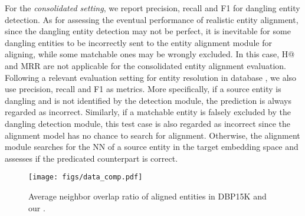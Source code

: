 For the \emph{consolidated setting},
we report precision, recall and F1 for dangling entity detection.
As for assessing the eventual performance of realistic entity alignment, since the dangling entity detection may not be perfect,
it is inevitable for some dangling entities to be incorrectly sent to the entity alignment module for aligning, while some matchable ones may be wrongly excluded.
In this case, H@ and MRR are not applicable for the consolidated entity alignment evaluation. 
Following a relevant evaluation setting for entity resolution in database \cite{DL4ER,EmbedER}, we also use precision, recall and F1 as metrics.
More specifically, if a source entity is dangling and is not identified by the detection module, the prediction is always regarded as incorrect. 
Similarly, if a matchable entity is falsely excluded by the dangling detection module, this test case is also regarded as incorrect since the alignment model has no chance to search for alignment. 
Otherwise, the alignment module searches for the NN of a source entity in the target embedding space and assesses if the predicated counterpart is correct. 

\begin{figure}[t]
	\centering
	\texttt{[image: figs/data\_comp.pdf]}
	\caption{Average neighbor overlap ratio of aligned entities in DBP15K and our \dataset.}
	\label{fig:data_comp}
\end{figure}

